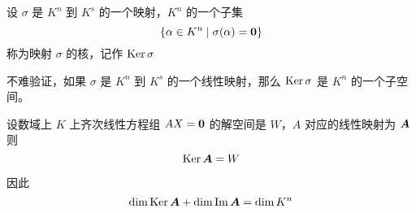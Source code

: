 \begin{definition}
	设 $\sigma$ 是 $K^n$ 到 $K^s$ 的一个映射，$K^n$ 的一个子集
	\[ \{ \alpha \in K^n \mid \sigma(\alpha) = \boldsymbol{0} \} \]
	称为映射 $\sigma$ 的核，记作 $\operatorname{Ker} \sigma$
\end{definition}

不难验证，如果 $\sigma$ 是 $K^n$ 到 $K^s$ 的一个线性映射，那么 $\operatorname{Ker} \sigma$ 是 $K^n$ 的一个子空间。

\begin{theorem}
	设数域上 $K$ 上齐次线性方程组 $AX = \boldsymbol{0}$ 的解空间是 $W$，$A$ 对应的线性映射为 $\boldsymbol{A}$ 则
	\[ \operatorname{Ker} \boldsymbol{A} = W \]
\end{theorem}

因此
\[ \dim \operatorname{Ker} \boldsymbol{A} + \dim \operatorname{Im} \boldsymbol{A} = \dim K^n \]
